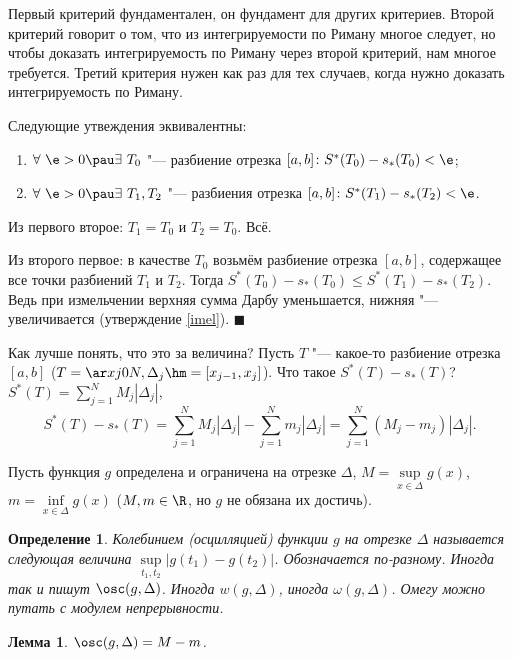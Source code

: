 \documentclass[a4paper,10pt,twoside]{article}
\newtheorem{Def}{Определение}[section]
\newtheorem{Th}{Лемма}[section]
\newenvironment{Zam}
     	{\par\noindent{\textbf{Замечание.}}}{}
\newenvironment{Proof}
       {\par\noindent{\textbf{Доказательство.}}}
       {\hfill$\scriptstyle\blacksquare$}
\begin{document}
 Первый критерий фундаментален, он фундамент для других критериев. Второй критерий говорит о том, что из интегрируемости по Риману многое следует, но чтобы доказать
 интегрируемость по Риману через второй критерий, нам многое требуется. Третий критерия нужен как раз для тех случаев, когда нужно доказать интегрируемость
 по Риману.
 
 \begin{Zam}
 Следующие утвеждения эквивалентны:
 \begin{enumerate}
   \item $\forall\ \e>0\pau\exists\  T_0$ "--- разбиение отрезка $[a,b]\colon S^*(T_0)-s_*(T_0)<\e$;
   \item $\forall\ \e>0\pau\exists\  T_1,T_2$ "--- разбиения отрезка $[a,b]\colon S^*(T_1)-s_*(T_2)<\e$.
 \end{enumerate}
 \end{Zam}
 
 \begin{Proof}
 	Из первого второе: $T_1=T_0$ и $T_2=T_0$. Всё.
 	
 	Из второго первое: в качестве $T_0$ возьмём разбиение отрезка $[a,b]$, содержащее все точки разбиений $T_1$ и $T_2$.
 	Тогда $S^*(T_0)-s_*(T_0)\leq S^*(T_1)-s_*(T_2)$. Ведь при измельчении верхняя сумма Дарбу уменьшается, нижняя "--- увеличивается (утверждение \ref{imel}).
 \end{Proof}
 
 Как лучше понять, что это за величина? Пусть $T$ "--- какое-то разбиение отрезка $[a,b]$ ($T=\ar xj0N, \Delta_j\hm=[x_{j-1},x_j]$). Что такое $S^*(T)-s_*(T)$?
 $S^*(T)=\sum\limits_{j=1}^NM_j|\Delta_j|$,
 $$S^*(T)-s_*(T)=\sum\limits_{j=1}^NM_j|\Delta_j|-\sum\limits_{j=1}^Nm_j|\Delta_j|=\sum\limits_{j=1}^N(M_j-m_j)|\Delta_j|.$$
 
 Пусть функция $g$ определена и ограничена на отрезке $\Delta$, $M=\sup\limits_{x\in\Delta}g(x)$, $m=\inf\limits_{x\in\Delta}g(x)$
 ($M,m\in\R$, но $g$ не обязана их достичь).
 
 \begin{Def}
 	Колебинием (осцилляцией) функции $g$ на отрезке $\Delta$ называется следующая величина $\sup\limits_{t_1,t_2}\big|g(t_1)-g(t_2)\big|$.
 	Обозначается по-разному. Иногда так и пишут $\osc(g,\Delta)$. Иногда $w(g,\Delta)$, иногда $\omega(g,\Delta)$. Омегу можно путать с модулем непрерывности.
 \end{Def}
 
 \begin{Th}
 	$\osc(g,\Delta)=M-m$.
 \end{Th}
 
\end{document}
